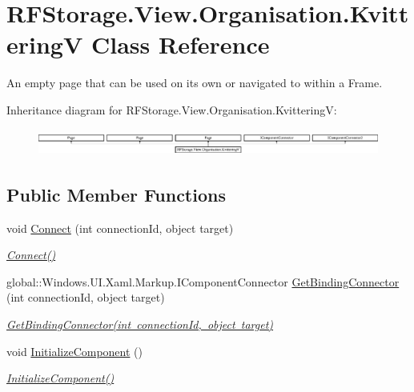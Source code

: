 \hypertarget{class_r_f_storage_1_1_view_1_1_organisation_1_1_kvittering_v}{}\section{R\+F\+Storage.\+View.\+Organisation.\+KvitteringV Class Reference}
\label{class_r_f_storage_1_1_view_1_1_organisation_1_1_kvittering_v}


An empty page that can be used on its own or navigated to within a Frame.  


Inheritance diagram for R\+F\+Storage.\+View.\+Organisation.\+KvitteringV\+:\begin{figure}[H]
\begin{center}
\leavevmode
\includegraphics[height=0.881890cm]{class_r_f_storage_1_1_view_1_1_organisation_1_1_kvittering_v}
\end{center}
\end{figure}
\subsection*{Public Member Functions}
\begin{DoxyCompactItemize}
\item 
void \mbox{\hyperlink{class_r_f_storage_1_1_view_1_1_organisation_1_1_kvittering_v_aa1220cf181e4f10773feb090d1a0d6a0}{Connect}} (int connection\+Id, object target)
\begin{DoxyCompactList}\small\item\em \mbox{\hyperlink{class_r_f_storage_1_1_view_1_1_organisation_1_1_kvittering_v_aa1220cf181e4f10773feb090d1a0d6a0}{Connect()}} \end{DoxyCompactList}\item 
global\+::\+Windows.\+U\+I.\+Xaml.\+Markup.\+I\+Component\+Connector \mbox{\hyperlink{class_r_f_storage_1_1_view_1_1_organisation_1_1_kvittering_v_a2eb92c4d9d4ef6ab0aed08083044615f}{Get\+Binding\+Connector}} (int connection\+Id, object target)
\begin{DoxyCompactList}\small\item\em \mbox{\hyperlink{class_r_f_storage_1_1_view_1_1_organisation_1_1_kvittering_v_a2eb92c4d9d4ef6ab0aed08083044615f}{Get\+Binding\+Connector(int connection\+Id, object target)}} \end{DoxyCompactList}\item 
void \mbox{\hyperlink{class_r_f_storage_1_1_view_1_1_organisation_1_1_kvittering_v_af4cdfc1cc8430c3282e5c1dce8560fea}{Initialize\+Component}} ()
\begin{DoxyCompactList}\small\item\em \mbox{\hyperlink{class_r_f_storage_1_1_view_1_1_organisation_1_1_kvittering_v_af4cdfc1cc8430c3282e5c1dce8560fea}{Initialize\+Component()}} \end{DoxyCompactList}\end{DoxyCompactItemize}


